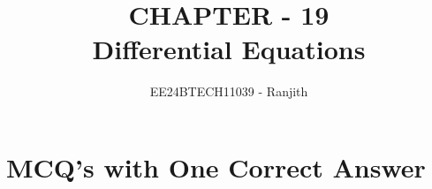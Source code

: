 \documentclass[journal]{IEEEtran}
\begin{document}

\vspace{3cm}

\title{CHAPTER - 19\\Differential Equations}
\author{EE24BTECH11039 - Ranjith}

{\let\newpage\relax\maketitle}

\renewcommand{\thefigure}{\theenumi}
\renewcommand{\thetable}{\theenumi}
\setlength{\intextsep}{10pt} %


\renewcommand{\thetable}{\theenumi}


\section { MCQ's with One Correct Answer}
\end{document}
